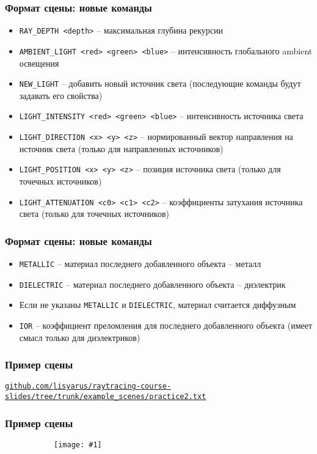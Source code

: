 \documentclass[10pt]{beamer}
\newcommand{\slideimage}[1]{
  \begin{figure}
    \begin{adjustbox}{width=\textwidth, totalheight=\textheight-2\baselineskip-2\baselineskip,keepaspectratio}
      \texttt{[image: \#1]}
    \end{adjustbox}
  \end{figure}
}
\begin{document}
\begin{frame}
\frametitle{Формат сцены: новые команды}
\begin{itemize}
\item \texttt{RAY\_DEPTH <depth>} -- максимальная глубина рекурсии
\item \texttt{AMBIENT\_LIGHT <red> <green> <blue>} -- интенсивность глобального ambient освещения
\item \texttt{NEW\_LIGHT} -- добавить новый источник света (последующие команды будут задавать его свойства)
\item \texttt{LIGHT\_INTENSITY <red> <green> <blue>} -- интенсивность источника света
\item \texttt{LIGHT\_DIRECTION <x> <y> <z>} -- нормированный вектор направления на источник света (только для направленных источников)
\item \texttt{LIGHT\_POSITION <x> <y> <z>} -- позиция источника света (только для точечных источников)
\item \texttt{LIGHT\_ATTENUATION <c0> <c1> <c2>} -- коэффициенты затухания источника света (только для точечных источников)
\end{itemize}
\end{frame}

\begin{frame}
\frametitle{Формат сцены: новые команды}
\begin{itemize}
\item \texttt{METALLIC} -- материал последнего добавленного объекта -- металл
\item \texttt{DIELECTRIC} -- материал последнего добавленного объекта -- диэлектрик
\item Если не указаны \texttt{METALLIC} и \texttt{DIELECTRIC}, материал считается диффузным
\item \texttt{IOR} -- коэффициент преломления для последнего добавленного объекта (имеет смысл только для диэлектриков)
\end{itemize}
\end{frame}


\begin{frame}[fragile]
\frametitle{Пример сцены}
\href{https://github.com/lisyarus/raytracing-course-slides/tree/trunk/example_scenes/practice2.txt}{\texttt{github.com/lisyarus/raytracing-course-slides/tree/trunk/example\_scenes/practice2.txt}}
\end{frame}

\begin{frame}
\frametitle{Пример сцены}
\begin{figure}
\slideimage{result.png}
\end{figure}
\end{frame}
\end{document}
